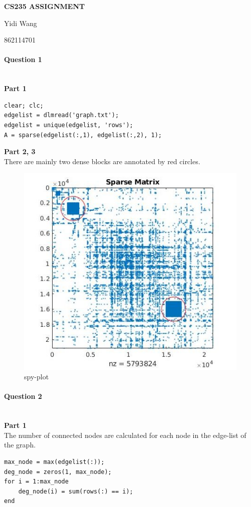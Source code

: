 \documentclass[11pt]{article}
\begin{document}
\centerline{\large \bf CS235 ASSIGNMENT}
\centerline{Yidi Wang}
\centerline{862114701}

\vskip 0.1in


\paragraph{Question 1}\mbox{} \\
\noindent
\textbf{Part 1}
\begin{verbatim}
clear; clc;
edgelist = dlmread('graph.txt');
edgelist = unique(edgelist, 'rows');
A = sparse(edgelist(:,1), edgelist(:,2), 1);
\end{verbatim}

\noindent
\textbf{Part 2, 3} \\
There are mainly two dense blocks are annotated by red circles.
\begin{figure}[H]
    \centering
    \includegraphics[scale=0.56]{figs/q1.jpg}
    \caption{spy-plot}
    \label{fig::spy}
\end{figure}

\paragraph{Question 2}\mbox{} \\
\noindent
\textbf{Part 1} \\
The number of connected nodes are calculated for each node in the edge-list of the graph.
\begin{verbatim}
max_node = max(edgelist(:));
deg_node = zeros(1, max_node);
for i = 1:max_node
    deg_node(i) = sum(rows(:) == i);
end
\end{verbatim}
\end{document}
